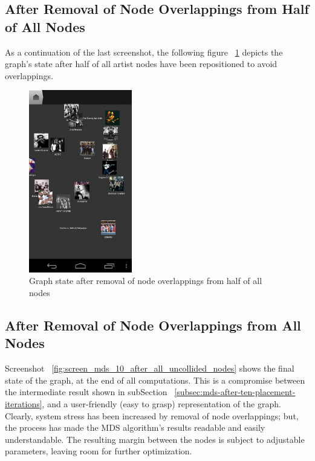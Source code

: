 \newpage
\subsection{After Removal of Node Overlappings from Half of All Nodes}

As a continuation of the last screenshot, the following figure ~\ref{fig:screen_mds_9_after_half_uncollided_nodes} depicts the graph's state after half of all artist nodes have been repositioned to avoid overlappings.

\begin{figure}[H]
  \centering
    \includegraphics[width=0.4\textwidth]{figures/screen_mds_9_after_half_uncollided_nodes}
  \caption{Graph state after removal of node overlappings from half of all nodes}
  \label{fig:screen_mds_9_after_half_uncollided_nodes}
\end{figure}

\newpage
\subsection{After Removal of Node Overlappings from All Nodes}

Screenshot ~\ref{fig:screen_mds_10_after_all_uncollided_nodes} shows the final state of the graph, at the end of all computations. This is a compromise between the intermediate result shown in subSection ~\ref{subsec:mds-after-ten-placement-iterations}, and a user-friendly (easy to grasp) representation of the graph. Clearly, system stress has been increased by removal of node overlappings; but, the process has made the MDS algorithm's results readable and easily understandable. The resulting margin between the nodes is subject to adjustable parameters, leaving room for further optimization.

